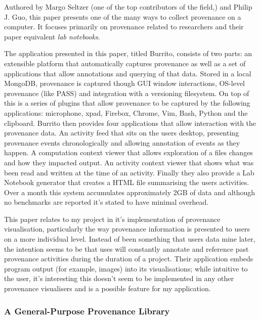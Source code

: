 Authored by Margo Seltzer (one of the top contributors of the field\cite{Macko2012,Seltzer2011,Borkin2013,Muniswamy-Reddy2010,Braun2008},) and Philip J. Guo, this paper presents one of the many ways to collect provenance on a computer. It focuses primarily on provenance related to researchers and their paper equivalent \textit{lab notebooks}.

The application presented in this paper, titled Burrito, consists of two parts: an extensible platform that automatically captures provenance as well as a set of applications that allow annotations and querying of that data. Stored in a local MongoDB, provenance is captured though GUI window interactions, OS-level provenance (like PASS\cite{Muniswamy2006}) and integration with a versioning filesystem. On top of this is a series of plugins that allow provenance to be captured by the following applications: microphone, xpad, Firebox, Chrome, Vim, Bash, Python and the clipboard. Burrito then provides four applications that allow interaction with the provenance data. An activity feed that sits on the users desktop, presenting provenance events chronologically and allowing annotation of events as they happen. A computation context viewer that allows exploration of a files changes and how they impacted output. An activity context viewer that shows what was been read and written at the time of an activity. Finally they also provide a Lab Notebook generator that creates a HTML file summarising the users activities. Over a month this system accumulates approximately 2GB of data and although no benchmarks are reported it's stated to have minimal overhead.

This paper relates to my project in it's implementation of provenance visualisation, particularly the way provenance information is presented to users on a more individual level. Instead of been something that users data mine later, the intention seems to be that uses will constantly annotate and reference past provenance activities during the duration of a project. Their application embeds program output (for example, images) into its visualisations; while intuitive to the user, it's interesting this doesn't seem to be implemented in any other provenance visualisers and is a possible feature for my application.

\subsubsection{A General-Purpose Provenance Library\cite{Macko2012}}
\label{sub:a_general_purpose_provenance_library}

